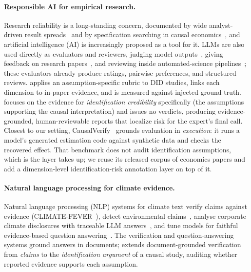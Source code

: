 \paragraph{Responsible AI for empirical research.}
Research reliability is a long-standing concern, documented by wide
analyst-driven result spreads~\cite{silberzahn2018many,botviniknezer2020variability}
and by specification searching in causal economics~\cite{brodeur2020methods},
and artificial intelligence (AI) is increasingly proposed as a tool for it. LLMs
are also used directly as evaluators and reviewers, judging model
outputs~\cite{zheng2023judge}, giving feedback on research
papers~\cite{liang2024feedback}, and reviewing inside automated-science
pipelines~\cite{lu2024aiscientist}; these evaluators already produce ratings,
pairwise preferences, and structured reviews. \sys{} applies an
assumption-specific rubric to DID studies, links each dimension to in-paper
evidence, and is measured against injected ground truth. \sys{}
focuses on the evidence for \emph{identification credibility} specifically
(the assumptions supporting the causal interpretation) and issues no verdicts, producing evidence-grounded, human-reviewable reports that localize
risk for the expert's final call. Closest to our setting,
CausalVerify~\cite{causalverify} grounds evaluation in \emph{execution}: it runs
a model's generated estimation code against synthetic data and checks the
recovered effect. That benchmark does not audit identification assumptions, which is the
layer \sys{} takes up; we reuse its released
corpus of economics papers and add a dimension-level
identification-risk annotation layer on top of it.

\paragraph{Natural language processing for climate evidence.}
Natural language processing (NLP) systems for climate text verify claims
against evidence
(CLIMATE-FEVER~\cite{climatefever2020}), detect environmental
claims~\cite{stammbach2023environmental}, analyse corporate climate disclosures
with traceable LLM answers~\cite{ni2023chatreport}, and tune models for
faithful evidence-based question answering~\cite{schimanski2024faithful}.
The verification and question-answering systems ground answers in documents;
\sys{} extends document-grounded
verification from \emph{claims} to the \emph{identification argument} of a
causal study, auditing whether reported evidence supports each assumption.

